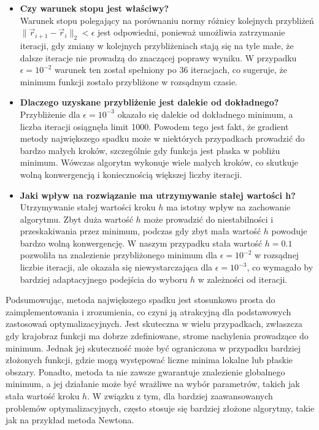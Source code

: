 \documentclass{article}
\begin{document}
\begin{itemize}
    \item \textbf{Czy warunek stopu jest właściwy?} \\
    Warunek stopu polegający na porównaniu normy różnicy kolejnych przybliżeń $\|\vec{r}_{i+1} - \vec{r}_i\|_2 < \epsilon$ jest odpowiedni, ponieważ umożliwia zatrzymanie iteracji, gdy zmiany w kolejnych przybliżeniach stają się na tyle małe, że dalsze iteracje nie prowadzą do znaczącej poprawy wyniku. W przypadku $\epsilon = 10^{-2}$ warunek ten został spełniony po 36 iteracjach, co sugeruje, że minimum funkcji zostało przybliżone w rozsądnym czasie.

    \item \textbf{Dlaczego uzyskane przybliżenie jest dalekie od dokładnego?} \\
    Przybliżenie dla $\epsilon = 10^{-3}$ okazało się dalekie od dokładnego minimum, a liczba iteracji osiągnęła limit 1000. Powodem tego jest fakt, że gradient metody największego spadku może w niektórych przypadkach prowadzić do bardzo małych kroków, szczególnie gdy funkcja jest płaska w pobliżu minimum. Wówczas algorytm wykonuje wiele małych kroków, co skutkuje wolną konwergencją i koniecznością większej liczby iteracji.

    \item \textbf{Jaki wpływ na rozwiązanie ma utrzymywanie stałej wartości h?} \\
    Utrzymywanie stałej wartości kroku $h$ ma istotny wpływ na zachowanie algorytmu. Zbyt duża wartość $h$ może prowadzić do niestabilności i przeskakiwania przez minimum, podczas gdy zbyt mała wartość $h$ powoduje bardzo wolną konwergencję. W naszym przypadku stała wartość $h = 0.1$ pozwoliła na znalezienie przybliżonego minimum dla $\epsilon = 10^{-2}$ w rozsądnej liczbie iteracji, ale okazała się niewystarczająca dla $\epsilon = 10^{-3}$, co wymagało by bardziej adaptacyjnego podejścia do wyboru $h$ w zależności od iteracji.
\end{itemize}

\newpage
\noindent
Podsumowując, metoda największego spadku jest stosunkowo prosta do zaimplementowania i zrozumienia, co czyni ją atrakcyjną dla podstawowych zastosowań optymalizacyjnych. Jest skuteczna w wielu przypadkach, zwłaszcza gdy krajobraz funkcji ma dobrze zdefiniowane, strome nachylenia prowadzące do minimum. Jednak jej skuteczność może być ograniczona w przypadku bardziej złożonych funkcji, gdzie mogą występować liczne minima lokalne lub płaskie obszary. Ponadto, metoda ta nie zawsze gwarantuje znalezienie globalnego minimum, a jej działanie może być wrażliwe na wybór parametrów, takich jak stała wartość kroku $h$. W związku z tym, dla bardziej zaawansowanych problemów optymalizacyjnych, często stosuje się bardziej złożone algorytmy, takie jak na przykład metoda Newtona.
\end{document}
